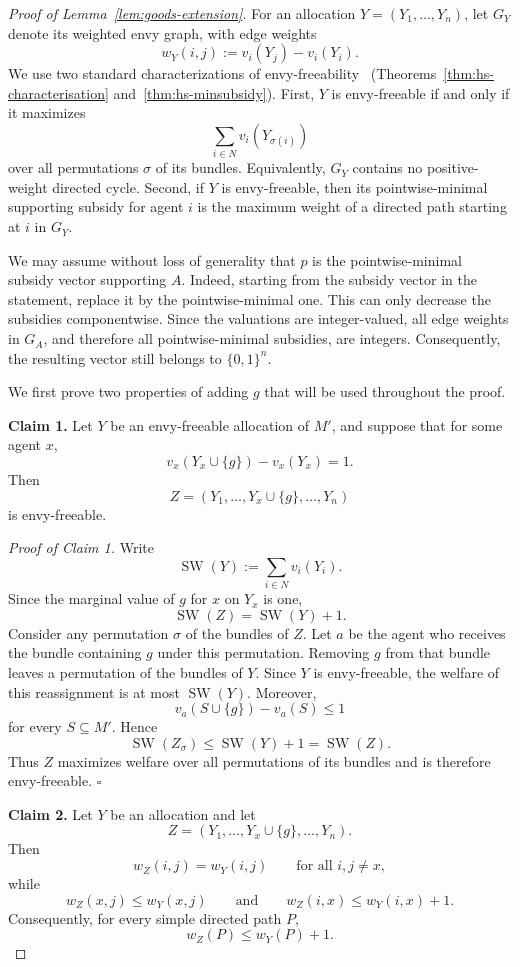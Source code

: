 \begin{proof}[Proof of Lemma~\ref{lem:goods-extension}]
For an allocation $Y=(Y_1,\ldots,Y_n)$, let $G_Y$ denote its weighted envy
graph, with edge weights
\[
  w_Y(i,j):=v_i(Y_j)-v_i(Y_i).
\]
We use two standard characterizations of envy-freeability~\cite{HS19,BKNS22}
(Theorems~\ref{thm:hs-characterisation} and~\ref{thm:hs-minsubsidy}). First,
$Y$ is envy-freeable if and only if it maximizes
\[
  \sum_{i\in N}v_i(Y_{\sigma(i)})
\]
over all permutations $\sigma$ of its bundles. Equivalently, $G_Y$ contains no
positive-weight directed cycle. Second, if $Y$ is envy-freeable, then its
pointwise-minimal supporting subsidy for agent $i$ is the maximum weight of a
directed path starting at $i$ in $G_Y$.

We may assume without loss of generality that $p$ is the pointwise-minimal
subsidy vector supporting $A$. Indeed, starting from the subsidy vector in the
statement, replace it by the pointwise-minimal one. This can only decrease the
subsidies componentwise. Since the valuations are integer-valued, all edge
weights in $G_A$, and therefore all pointwise-minimal subsidies, are integers.
Consequently, the resulting vector still belongs to $\{0,1\}^n$.

We first prove two properties of adding $g$ that will be used throughout the
proof.

\medskip
\noindent
\textbf{Claim 1.}
Let $Y$ be an envy-freeable allocation of $M'$, and suppose that for some agent
$x$,
\[
  v_x(Y_x\cup\{g\})-v_x(Y_x)=1.
\]
Then
\[
  Z=(Y_1,\ldots,Y_x\cup\{g\},\ldots,Y_n)
\]
is envy-freeable.

\smallskip
\noindent
\emph{Proof of Claim 1.}
Write
\[
  \operatorname{SW}(Y):=\sum_{i\in N}v_i(Y_i).
\]
Since the marginal value of $g$ for $x$ on $Y_x$ is one,
\[
  \operatorname{SW}(Z)=\operatorname{SW}(Y)+1.
\]
Consider any permutation $\sigma$ of the bundles of $Z$. Let $a$ be the agent who
receives the bundle containing $g$ under this permutation. Removing $g$ from that
bundle leaves a permutation of the bundles of $Y$. Since $Y$ is envy-freeable,
the welfare of this reassignment is at most $\operatorname{SW}(Y)$. Moreover,
\[
  v_a(S\cup\{g\})-v_a(S)\leq 1
\]
for every $S\subseteq M'$. Hence
\[
  \operatorname{SW}(Z_\sigma)
  \leq \operatorname{SW}(Y)+1
  =\operatorname{SW}(Z).
\]
Thus $Z$ maximizes welfare over all permutations of its bundles and is therefore
envy-freeable.
\hfill$\square$

\medskip
\noindent
\textbf{Claim 2.}
Let $Y$ be an allocation and let
\[
  Z=(Y_1,\ldots,Y_x\cup\{g\},\ldots,Y_n).
\]
Then
\[
  w_Z(i,j)=w_Y(i,j)
  \qquad
  \text{for all }i,j\neq x,
\]
while
\[
  w_Z(x,j)\leq w_Y(x,j)
  \qquad\text{and}\qquad
  w_Z(i,x)\leq w_Y(i,x)+1.
\]
Consequently, for every simple directed path $P$,
\begin{equation}\label{eq:ge-S1}
  w_Z(P)\leq w_Y(P)+1.
\end{equation}


\end{proof}
